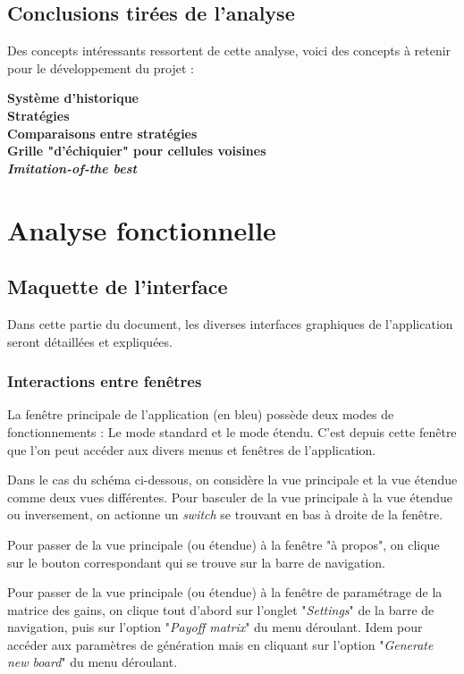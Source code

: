 \documentclass[a4paper]{article}
\begin{document}
\subsection{Conclusions tirées de l'analyse}
Des concepts intéressants ressortent de cette analyse, voici des concepts à retenir pour le développement du projet :

\textbf{Système d'historique}\\
\textbf{Stratégies}\\
\textbf{Comparaisons entre stratégies}\\
\textbf{Grille "d'échiquier" pour cellules voisines}\\
\textbf{\textit{Imitation-of-the best}}

\pagebreak
\section{Analyse fonctionnelle}
\subsection{Maquette de l'interface}
Dans cette partie du document, les diverses interfaces graphiques de l'application seront détaillées et expliquées.

\subsubsection{Interactions entre fenêtres}
La fenêtre principale de l'application (en bleu) possède deux modes de fonctionnements : Le mode standard et le mode étendu. C'est depuis cette fenêtre que l'on peut accéder aux divers menus et fenêtres de l'application.

Dans le cas du schéma ci-dessous, on considère la vue principale et la vue étendue comme deux vues différentes. Pour basculer de la vue principale à la vue étendue ou inversement, on actionne un \textit{switch} se trouvant en bas à droite de la fenêtre.

Pour passer de la vue principale (ou étendue) à la fenêtre "à propos", on clique sur le bouton correspondant qui se trouve sur la barre de navigation.

Pour passer de la vue principale (ou étendue) à la fenêtre de paramétrage de la matrice des gains, on clique tout d'abord sur l'onglet "\textit{Settings}" de la barre de navigation, puis sur l'option "\textit{Payoff matrix}" du menu déroulant. Idem pour accéder aux paramètres de génération mais en cliquant sur l'option "\textit{Generate new board}" du menu déroulant.
\end{document}
